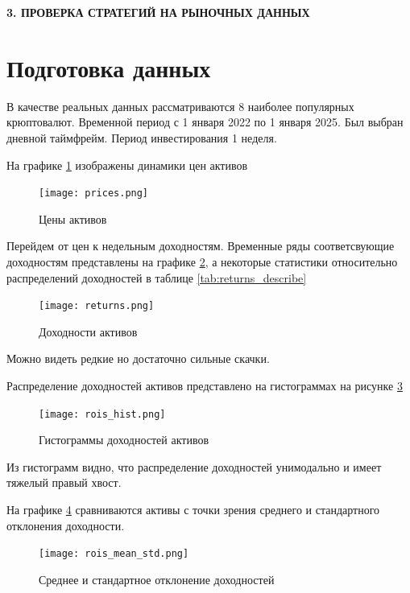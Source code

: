 \newpage
\begin{center}
	\textbf{\large 3. ПРОВЕРКА СТРАТЕГИЙ НА РЫНОЧНЫХ ДАННЫХ}
\end{center}

\section{Подготовка данных}

В качестве реальных данных рассматриваются 8 наиболее популярных крюптовалют.
Временной период с 1 января 2022 по  1 января 2025.
Был выбран дневной таймфрейм.
Период инвестирования 1 неделя.

На графике \ref{fig:prices} изображены динамики цен активов 

\begin{figure}[H]
	\centering
	\texttt{[image: prices.png]}
	\caption{Цены активов}
	\label{fig:prices}
\end{figure}

Перейдем от цен к недельным доходностям. Временные ряды соответсвующие доходностям 
представлены на графике \ref{fig:returns}, а некоторые статистики относительно распределений
доходностей в таблице \ref{tab:returns_describe}



\begin{figure}[H]
	\centering
	\texttt{[image: returns.png]}
	\caption{Доходности активов}
	\label{fig:returns}
\end{figure}
Можно видеть редкие но достаточно сильные скачки.

Распределение доходностей активов представлено на гистограммах на рисунке \ref{fig:rois_hist}

\begin{figure}[H]
	\centering
	\texttt{[image: rois\_hist.png]}
	\caption{Гистограммы доходностей активов}
	\label{fig:rois_hist}
\end{figure}

Из гистограмм видно, что распределение доходностей унимодально и имеет тяжелый правый хвост.

На графике \ref{fig:rois_mean_std} сравниваются активы с точки зрения 
среднего и стандартного отклонения доходности.

\begin{figure}[H]
	\centering
	\texttt{[image: rois\_mean\_std.png]}
	\caption{Среднее и стандартное отклонение доходностей}
	\label{fig:rois_mean_std}
\end{figure}

